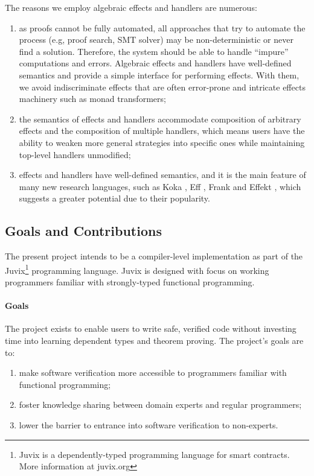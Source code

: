 \documentclass[sigconfl]{acmart}
\begin{document}
The reasons we employ algebraic effects and handlers are numerous:
\begin{enumerate}
\item as proofs cannot be fully automated, all approaches that try to automate
  the process (e.g, proof search, SMT solver) may be non-deterministic or
  never find a solution. Therefore, the system should be able to handle
  ``impure'' computations and errors. Algebraic effects and handlers have
  well-defined semantics and provide a simple interface for performing effects.
  With them, we avoid indiscriminate effects that are often error-prone and
  intricate effects machinery such as monad transformers;
\item the semantics of effects and handlers accommodate composition of arbitrary effects and the
  composition of multiple handlers, which means users have the ability to weaken
  more general strategies into specific ones while maintaining top-level
  handlers unmodified;
\item effects and handlers have well-defined semantics, and it is the main feature of many new
  research languages, such as Koka \cite{Leijen2017}, Eff \cite{Bauer2012},
  Frank \cite{DBLP:journals/jfp/ConventLMM20} and Effekt
  \cite{DBLP:journals/jfp/BrachthauserSO20}, which suggests a greater
  potential due to their popularity.
\end{enumerate}

\subsection{Goals and Contributions}

The present project intends to be a compiler-level implementation as part of the
Juvix\footnote{Juvix is a dependently-typed programming language for smart
  contracts. More information at juvix.org} programming language. Juvix is designed
with focus on working programmers familiar with strongly-typed functional
programming.

\paragraph{Goals} The project exists to enable users to write safe, verified
code without investing time into learning dependent types and theorem proving.
The project's goals are to:
\begin{enumerate}
\item make software verification more accessible to programmers familiar with
  functional programming;
\item foster knowledge sharing between domain experts and regular programmers;
\item lower the barrier to entrance into software verification to non-experts.
\end{enumerate}
\end{document}
